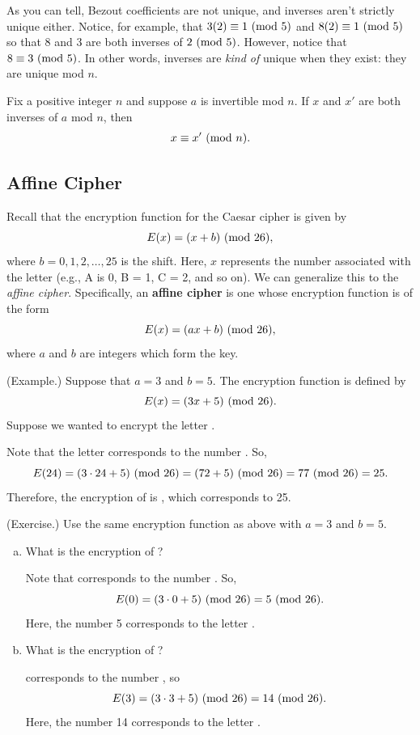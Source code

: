 \documentclass[letterpaper]{article}
\begin{document}
As you can tell, Bezout coefficients are not unique, and inverses aren't strictly unique either. Notice, for example, that $3(2) \equiv 1 \ (\mathrm{mod}\ 5)$ and $8(2) \equiv 1 \ (\mathrm{mod}\ 5)$ so that $8$ and $3$ are both inverses of $2 \ (\mathrm{mod}\ 5)$. However, notice that $8 \equiv 3 \ (\mathrm{mod}\ 5)$. In other words, inverses are \emph{kind of} unique when they exist: they are unique mod $n$. 

\begin{lemma}{}{}
    Fix a positive integer $n$ and suppose $a$ is invertible mod $n$. If $x$ and $x'$ are both inverses of $a$ mod $n$, then 
    \[x \equiv x' \ (\mathrm{mod}\ n).\]
\end{lemma}

\subsection{Affine Cipher}
Recall that the encryption function for the Caesar cipher is given by \[E(x) = (x + b) \ (\mathrm{mod}\ 26),\] where $b = 0, 1, 2, \hdots, 25$ is the shift. Here, $x$ represents the number associated with the letter (e.g., A is 0, B = 1, C = 2, and so on). We can generalize this to the \emph{affine cipher}. Specifically, an \textbf{affine cipher} is one whose encryption function is of the form \[E(x) = (ax + b) \ (\mathrm{mod}\ 26),\] where $a$ and $b$ are integers which form the key. 

\bigskip 

\begin{mdframed}
    (Example.) Suppose that $a = 3$ and $b = 5$. The encryption function is defined by \[E(x) = (3x + 5) \ (\mathrm{mod}\ 26).\] Suppose we wanted to encrypt the letter . 

    \bigskip 

    Note that the letter  corresponds to the number . So, 
    \[E(24) = (3 \cdot 24 + 5) \ (\mathrm{mod}\ 26) = (72 + 5) \ (\mathrm{mod}\ 26) = 77 \ (\mathrm{mod}\ 26) = 25.\]
    Therefore, the encryption of  is , which corresponds to 25.
\end{mdframed}

\begin{mdframed}[nobreak=true]
    (Exercise.) Use the same encryption function as above with $a = 3$ and $b = 5$.

    \begin{enumerate}[(a)]
        \item What is the encryption of ?
        \begin{mdframed}
            Note that  corresponds to the number . So, 
            \[E(0) = (3 \cdot 0 + 5) \ (\mathrm{mod}\ 26) = 5 \ (\mathrm{mod}\ 26).\]
            Here, the number 5 corresponds to the letter .
        \end{mdframed}
        \item What is the encryption of ?
        \begin{mdframed}
             corresponds to the number , so 
            \[E(3) = (3 \cdot 3 + 5) \ (\mathrm{mod}\ 26) = 14 \ (\mathrm{mod}\ 26).\]
            Here, the number 14 corresponds to the letter .
        \end{mdframed}
    \end{enumerate}
\end{mdframed}
\end{document}
